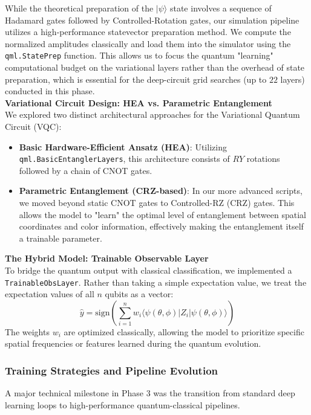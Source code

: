 \documentclass{oqireport}
\begin{document}
While the theoretical preparation of the $|\psi\rangle$ state involves a sequence of Hadamard gates followed by Controlled-Rotation gates, our simulation pipeline utilizes a high-performance statevector preparation method. We compute the normalized amplitudes classically and load them into the simulator using the \texttt{qml.StatePrep} function. This allows us to focus the quantum "learning" computational budget on the variational layers rather than the overhead of state preparation, which is essential for the deep-circuit grid searches (up to $22$ layers) conducted in this phase. \\


{\large \textbf{Variational Circuit Design: HEA vs. Parametric Entanglement}} \\
We explored two distinct architectural approaches for the Variational Quantum Circuit (VQC):
\begin{itemize}
    \item \textbf{Basic Hardware-Efficient Ansatz (HEA)}: Utilizing \texttt{qml.BasicEntanglerLayers}, this architecture consists of $RY$ rotations followed by a chain of CNOT gates. 
    \item \textbf{Parametric Entanglement (CRZ-based)}: In our more advanced scripts, we moved beyond static CNOT gates to Controlled-RZ (CRZ) gates. This allows the model to "learn" the optimal level of entanglement between spatial coordinates and color information, effectively making the entanglement itself a trainable parameter.
\end{itemize} 


{\large \textbf{The Hybrid Model: Trainable Observable Layer}} \\
To bridge the quantum output with classical classification, we implemented a \texttt{TrainableObsLayer}. Rather than taking a simple expectation value, we treat the expectation values of all $n$ qubits as a vector:
\begin{equation}
\hat{y} = \text{sign}\left( \sum_{i=1}^{n} w_i \langle \psi(\theta, \phi) | Z_i | \psi(\theta, \phi) \rangle \right)
\end{equation}
The weights $w_i$ are optimized classically, allowing the model to prioritize specific spatial frequencies or features learned during the quantum evolution.

\subsubsection{Training Strategies and Pipeline Evolution}
A major technical milestone in Phase $3$ was the transition from standard deep learning loops to high-performance quantum-classical pipelines. \\
\end{document}
